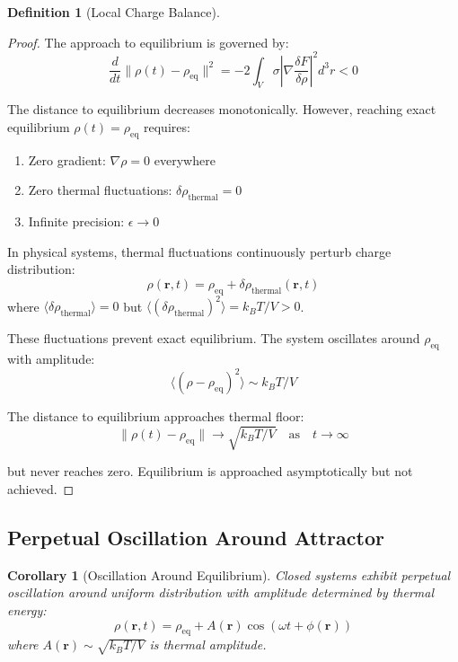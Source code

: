 \documentclass[12pt,a4paper]{article}
\theoremstyle{plain}
\newtheorem{corollary}[theorem]{Corollary}
\theoremstyle{definition}
\newtheorem{definition}[theorem]{Definition}
\theoremstyle{remark}
\begin{document}
\begin{definition}[Local Charge Balance]
\begin{proof}
The approach to equilibrium is governed by:
\begin{equation}
\frac{d}{dt} \|\rho(t) - \rho_{\text{eq}}\|^2 = -2 \int_V \sigma \left| \nabla \frac{\delta F}{\delta \rho} \right|^2 d^3r < 0
\end{equation}

The distance to equilibrium decreases monotonically. However, reaching exact equilibrium $\rho(t) = \rho_{\text{eq}}$ requires:
\begin{enumerate}
\item Zero gradient: $\nabla \rho = 0$ everywhere
\item Zero thermal fluctuations: $\delta \rho_{\text{thermal}} = 0$
\item Infinite precision: $\epsilon \to 0$
\end{enumerate}

In physical systems, thermal fluctuations continuously perturb charge distribution:
\begin{equation}
\rho(\mathbf{r}, t) = \rho_{\text{eq}} + \delta \rho_{\text{thermal}}(\mathbf{r}, t)
\end{equation}
where $\langle \delta \rho_{\text{thermal}} \rangle = 0$ but $\langle (\delta \rho_{\text{thermal}})^2 \rangle = k_B T / V > 0$.

These fluctuations prevent exact equilibrium. The system oscillates around $\rho_{\text{eq}}$ with amplitude:
\begin{equation}
\langle (\rho - \rho_{\text{eq}})^2 \rangle \sim k_B T / V
\end{equation}

The distance to equilibrium approaches thermal floor:
\begin{equation}
\|\rho(t) - \rho_{\text{eq}}\| \to \sqrt{k_B T / V} \quad \text{as} \quad t \to \infty
\end{equation}

but never reaches zero. Equilibrium is approached asymptotically but not achieved.
\end{proof}

\subsection{Perpetual Oscillation Around Attractor}

\begin{corollary}[Oscillation Around Equilibrium]
\label{cor:oscillation_equilibrium}
Closed systems exhibit perpetual oscillation around uniform distribution with amplitude determined by thermal energy:
\begin{equation}
\rho(\mathbf{r}, t) = \rho_{\text{eq}} + A(\mathbf{r}) \cos(\omega t + \phi(\mathbf{r}))
\end{equation}
where $A(\mathbf{r}) \sim \sqrt{k_B T / V}$ is thermal amplitude.
\end{corollary}


\end{definition}
\end{document}
